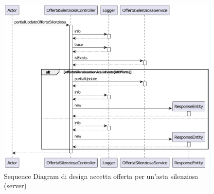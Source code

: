             \begin{figure}[htbp!]
                \centering
                    \includegraphics[width=1\linewidth]{Immagini/Diagrammi/Sequence Diagram/Design/Server Sequence Design/ServerSequenceAccettaOffertaDesign.pdf}
                \caption{Sequence Diagram di design accetta offerta per un'asta silenziosa (server)}
                \label{fig:Sequence Diagram di design accetta offerta per un'asta silenziosa (server)}
            \end{figure}

        \clearpage

